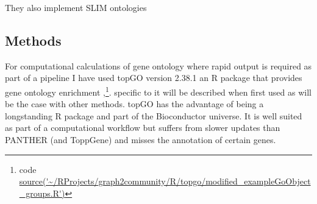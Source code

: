 They also implement SLIM ontologies 





\subsection{Methods}
\label{sec:GO enrichment methods}



For computational calculations of gene ontology where rapid output is required as part of a pipeline I have used topGO version 2.38.1 an R package that provides gene ontology enrichment \cite{alexa2006improved},\cite{alexa2009gene}\footnote{code \url{source('~/RProjects/graph2community/R/topgo/modified_exampleGoObject_groups.R')}}.
specific to it will be described when first used as will be the case with other methods. 
 topGO has the advantage of being a longstanding R package and part of the Bioconductor\cite{gentleman2004bioconductor} universe. It is well suited as part of a computational workflow but suffers from slower updates than PANTHER (and ToppGene) and misses the annotation of certain genes. 


